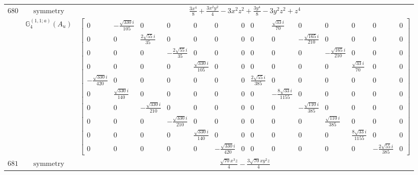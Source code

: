 \documentclass[fleqn,8pt,landscape]{jsarticle}
\begin{document}
\begin{longtable}{ccc}
$ 680 $ & $ \text{symmetry} $ & $ \frac{3 x^{4}}{8} + \frac{3 x^{2} y^{2}}{4} - 3 x^{2} z^{2} + \frac{3 y^{4}}{8} - 3 y^{2} z^{2} + z^{4} $ \\
$  $ & $ \mathbb{G}_{4}^{(1,1;a)}(A_{u}) $ & $ \begin{bmatrix} 0 & - \frac{\sqrt{330} i}{105} & 0 & 0 & 0 & 0 & 0 & 0 & \frac{\sqrt{33} i}{70} & 0 & 0 & 0 & 0 & 0 \\ 0 & 0 & \frac{2 \sqrt{55} i}{35} & 0 & 0 & 0 & 0 & 0 & 0 & - \frac{\sqrt{165} i}{210} & 0 & 0 & 0 & 0 \\ 0 & 0 & 0 & - \frac{2 \sqrt{55} i}{35} & 0 & 0 & 0 & 0 & 0 & 0 & - \frac{\sqrt{165} i}{210} & 0 & 0 & 0 \\ 0 & 0 & 0 & 0 & \frac{\sqrt{330} i}{105} & 0 & 0 & 0 & 0 & 0 & 0 & \frac{\sqrt{33} i}{70} & 0 & 0 \\ - \frac{\sqrt{330} i}{420} & 0 & 0 & 0 & 0 & 0 & 0 & \frac{2 \sqrt{55} i}{385} & 0 & 0 & 0 & 0 & 0 & 0 \\ 0 & \frac{\sqrt{330} i}{140} & 0 & 0 & 0 & 0 & 0 & 0 & - \frac{8 \sqrt{33} i}{1155} & 0 & 0 & 0 & 0 & 0 \\ 0 & 0 & - \frac{\sqrt{330} i}{210} & 0 & 0 & 0 & 0 & 0 & 0 & - \frac{\sqrt{110} i}{385} & 0 & 0 & 0 & 0 \\ 0 & 0 & 0 & - \frac{\sqrt{330} i}{210} & 0 & 0 & 0 & 0 & 0 & 0 & \frac{\sqrt{110} i}{385} & 0 & 0 & 0 \\ 0 & 0 & 0 & 0 & \frac{\sqrt{330} i}{140} & 0 & 0 & 0 & 0 & 0 & 0 & \frac{8 \sqrt{33} i}{1155} & 0 & 0 \\ 0 & 0 & 0 & 0 & 0 & - \frac{\sqrt{330} i}{420} & 0 & 0 & 0 & 0 & 0 & 0 & - \frac{2 \sqrt{55} i}{385} & 0 \end{bmatrix} $ \\ \hline
$ 681 $ & $ \text{symmetry} $ & $ \frac{\sqrt{70} x^{3} z}{4} - \frac{3 \sqrt{70} x y^{2} z}{4} $ \\

\end{longtable}
\end{document}
